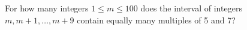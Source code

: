 For how many integers $1\le m\le100$ does the interval of integers $m,m+1,\ldots,m+9$ contain equally many multiples of 5 and 7?
